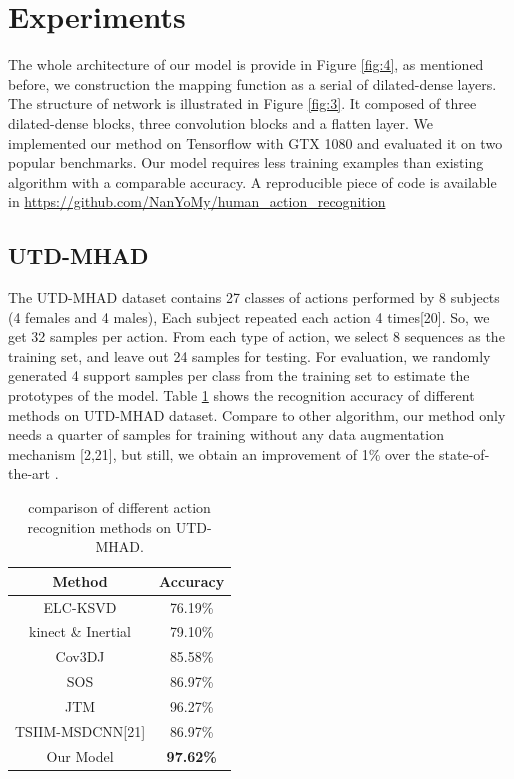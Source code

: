 \documentclass{bmvc2k}
\newcommand{\reffig}[1]{Figure \ref{#1}}
\newcommand{\reftab}[1]{Table \ref{#1}}
\begin{document}
\section{Experiments}
The whole architecture of our model is provide in \reffig{fig:4}, as mentioned before, we construction the mapping function as a serial of dilated-dense layers. The structure of network is illustrated in \reffig{fig:3}. It composed of three dilated-dense blocks, three convolution blocks and a flatten layer. We implemented our method on Tensorflow with GTX 1080 and evaluated it on two popular benchmarks. Our model requires less training examples than existing algorithm with a comparable accuracy. A reproducible piece of code is available in
 \url{https://github.com/NanYoMy/human_action_recognition}

\subsection*{UTD-MHAD}
The UTD-MHAD dataset contains 27 classes of actions performed by 8 subjects (4 females and 4 males), Each subject repeated each action 4 times[20]. So, we get 32 samples per action. From each type of action, we select 8 sequences as the training set, and leave out 24 samples for testing. For evaluation, we randomly generated 4 support samples per class from the training set to estimate the prototypes of the model. \reftab{tab:1} shows the recognition accuracy of different methods on UTD-MHAD dataset. Compare to other algorithm, our method only needs a quarter of samples for training without any data augmentation mechanism [2,21], but still, we obtain an improvement of 1\% over the state-of-the-art .


\begin{table}[htb]
	\begin{center}
		\caption{ comparison of different action recognition methods on UTD-MHAD.}
		\begin{tabular}{|c|c|}
			\hline
			Method & Accuracy \\
			\hline
			ELC-KSVD & 76.19\% \\
			\hline
			kinect \& Inertial & 79.10\% \\
			\hline
			Cov3DJ & 85.58\%\\
			\hline
			SOS & 86.97\% \\
			\hline
			JTM & 96.27\% \\
			\hline
			TSIIM-MSDCNN[21] & 86.97\% \\
			\hline
			Our Model & \bf{97.62\%} \\
			\hline
		\end{tabular}	
	\end{center}	
	\label{tab:1}
\end{table}
\end{document}

